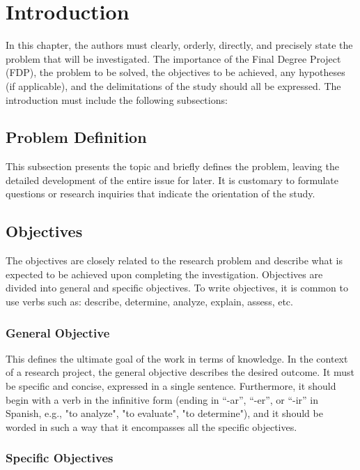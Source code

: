 \section{Introduction}

In this chapter, the authors must clearly, orderly, directly, and precisely state the problem that will be investigated. The importance of the Final Degree Project (FDP), the problem to be solved, the objectives to be achieved, any hypotheses (if applicable), and the delimitations of the study should all be expressed. The introduction must include the following subsections:

\subsection{Problem Definition}

This subsection presents the topic and briefly defines the problem, leaving the detailed development of the entire issue for later. It is customary to formulate questions or research inquiries that indicate the orientation of the study.

\subsection{Objectives}

The objectives are closely related to the research problem and describe what is expected to be achieved upon completing the investigation. Objectives are divided into general and specific objectives. To write objectives, it is common to use verbs such as: describe, determine, analyze, explain, assess, etc.

\subsubsection{General Objective}

This defines the ultimate goal of the work in terms of knowledge. In the context of a research project, the general objective describes the desired outcome. It must be specific and concise, expressed in a single sentence. Furthermore, it should begin with a verb in the infinitive form (ending in “-ar”, “-er”, or “-ir” in Spanish, e.g., "to analyze", "to evaluate", "to determine"), and it should be worded in such a way that it encompasses all the specific objectives.

\subsubsection{Specific Objectives}

